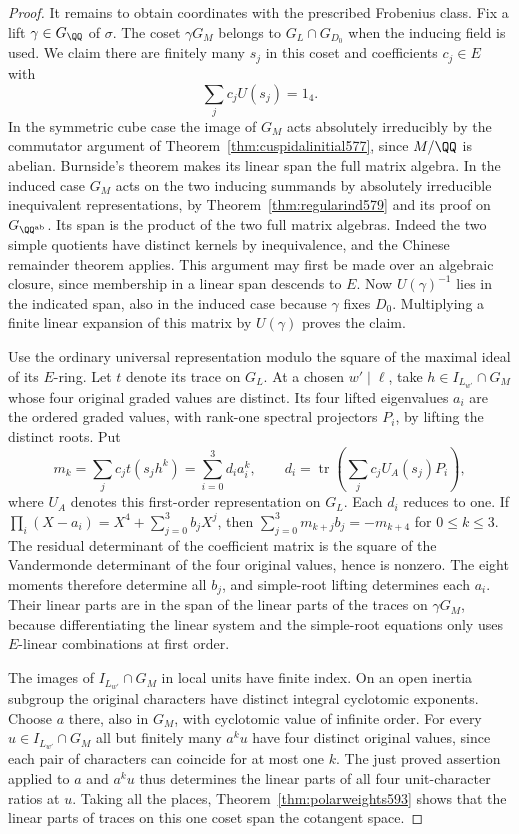 \documentclass[a4paper,11pt]{article}
\theoremstyle{definition}
\theoremstyle{remark}
\numberwithin{equation}{section}
\begin{document}
\begin{proof}
It remains to obtain coordinates with the prescribed Frobenius
class. Fix a lift \(\gamma\in G_\QQ\) of \(\sigma\). The coset
\(\gamma G_M\) belongs to \(G_L\cap G_{D_0}\) when the inducing
field is used. We claim there are finitely many \(s_j\) in this
coset and coefficients \(c_j\in E\) with
\[
                      \sum_j c_j U(s_j)=1_4 .
\]
In the symmetric cube case the image of \(G_M\) acts absolutely
irreducibly by the commutator argument of
Theorem~\ref{thm:cuspidalinitial577}, since \(M/\QQ\) is abelian.
Burnside's theorem makes its linear span the full matrix algebra.
In the induced case \(G_M\) acts on the two inducing summands
by absolutely irreducible inequivalent representations, by
Theorem~\ref{thm:regularind579} and its proof on
\(G_{\QQ^{\rm ab}}\). Its span is the product of the two full
matrix algebras. Indeed the two simple quotients have distinct
kernels by inequivalence, and the Chinese remainder theorem
applies. This argument may first be made over an algebraic
closure, since membership in a linear span descends to \(E\).
Now \(U(\gamma)^{-1}\) lies in the indicated span, also in the
induced case because \(\gamma\) fixes \(D_0\). Multiplying a
finite linear expansion of this matrix by \(U(\gamma)\)
proves the claim.

Use the ordinary universal representation modulo the square
of the maximal ideal of its \(E\)-ring. Let \(t\) denote its
trace on \(G_L\). At a chosen \(w'\mid\ell\), take
\(h\in I_{L_{w'}}\cap G_M\) whose four original graded values
are distinct. Its four lifted eigenvalues \(a_i\) are the
ordered graded values, with rank-one spectral projectors
\(P_i\), by lifting the distinct roots. Put
\[
             m_k=\sum_j c_j t(s_jh^k)=\sum_{i=0}^{3} d_i a_i^k,
       \qquad d_i=\operatorname{tr}\left(\sum_j c_j U_A(s_j)P_i\right),
\]
where \(U_A\) denotes this first-order representation on \(G_L\).
Each \(d_i\) reduces to one. If
\(\prod_i(X-a_i)=X^4+\sum_{j=0}^3 b_jX^j\), then
\(\sum_{j=0}^3 m_{k+j}b_j=-m_{k+4}\) for \(0\le k\le3\).
The residual determinant of the coefficient matrix is the
square of the Vandermonde determinant of the four original
values, hence is nonzero. The eight moments therefore
determine all \(b_j\), and simple-root lifting determines
each \(a_i\). Their linear parts are in the span of the
linear parts of the traces on \(\gamma G_M\), because
differentiating the linear system and the simple-root
equations only uses \(E\)-linear combinations at first order.

The images of \(I_{L_{w'}}\cap G_M\) in local units have
finite index. On an open inertia subgroup the original
characters have distinct integral cyclotomic exponents.
Choose \(a\) there, also in \(G_M\), with cyclotomic value
of infinite order. For every \(u\in I_{L_{w'}}\cap G_M\)
all but finitely many \(a^k u\) have four distinct original
values, since each pair of characters can coincide for at
most one \(k\). The just proved assertion applied to \(a\)
and \(a^k u\) thus determines the linear parts of all four
unit-character ratios at \(u\). Taking all the places,
Theorem~\ref{thm:polarweights593} shows that the linear
parts of traces on this one coset span the cotangent space.


\end{proof}
\end{document}
